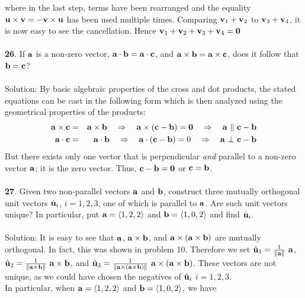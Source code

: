 \documentclass[12pt]{amsbook}
\newcommand{\la}{\langle}
\newcommand{\ra}{\rangle}
\begin{document}
where in the last step, terms have been rearranged and the equality ${\bf u}\times{\bf v}=-{\bf v}\times{\bf u}$ has been used multiple times. Comparing ${\bf v}_1+{\bf v}_2$ to ${\bf v}_3+{\bf v}_4$, it is now easy to see the cancellation. Hence ${\bf v}_1+{\bf v}_2+{\bf v}_3+{\bf v}_4={\bf 0}$
\\
\\
{\small\bf 26}.  If ${\bf a}$ is a non-zero vector,
${\bf a}\cdot{\bf b}={\bf a}\cdot{\bf c}$, and ${\bf
a}\times{\bf b}={\bf a}\times{\bf c}$, does it follow that ${\bf
b}={\bf c}$?\\
\\
{\sc Solution}: By basic algebraic properties of the cross and dot products,
the stated equations can be cast in the following form which is then 
analyzed using the geometrical properties of the products: 
\begin{eqnarray*}
{\bf a}\times {\bf c}&=&{\bf a}\times {\bf b}\quad
\Rightarrow\quad {\bf a}\times({\bf c}-{\bf b})={\bf 0}
\quad\Rightarrow\quad {\bf a}\ \| \ {\bf c}-{\bf b}\\
{\bf a}\cdot {\bf c}&=&{\bf a}\cdot {\bf b}\quad
\Rightarrow\quad {\bf a}\cdot({\bf c}-{\bf b})=0
\quad\Rightarrow\quad {\bf a}\ \bot \ {\bf c}-{\bf b}
\end{eqnarray*}
But there exists only one vector that is perpendicular {\it and} parallel to a
non-zero vector ${\bf a}$; it is the zero vector. Thus,
${\bf c}-{\bf b}={\bf 0}$ or ${\bf c}={\bf b}$.
\\
\\
{\small\bf 27}. Given two non-parallel vectors ${\bf a}$ and ${\bf b}$,
construct three mutually orthogonal unit vectors 
$\hat{\bf u}_i$, $i=1,2,3$,
one of which is parallel to ${\bf a}$. Are such unit vectors
unique?
In particular, put ${\bf a}=\la 1,2,2\ra$ and 
${\bf b}=\la 1,0,2\ra$ and find $\hat{\bf u}_i$.\\
\\
{\sc Solution}: It is easy to see that ${\bf a}$, ${\bf a}\times{\bf b}$, and ${\bf a}\times({\bf a}\times{\bf b})$ are mutually orthogonal. In fact, this was shown in problem 10. Therefore we set 
$\hat{\bf u}_1=\frac{1}{\|{\bf a}\|} \ {\bf a}$, 
$\hat{\bf u}_2=\frac{1}{\|{\bf a}\times{\bf b}\|} \ {\bf a}\times{\bf b}$, and $\hat{\bf u}_3=\frac{1}{\|{\bf a}\times({\bf a}\times{\bf b})\|} \ {\bf a}\times({\bf a}\times{\bf b})$. These vectors are not unique, as we could have chosen the negatives of $\hat{\bf u}_i$ $i=1,2,3$.
\\
In particular, when ${\bf a}=\la 1,2,2 \ra$ and ${\bf b}=\la 1,0,2 \ra$, we have 
\end{document}
